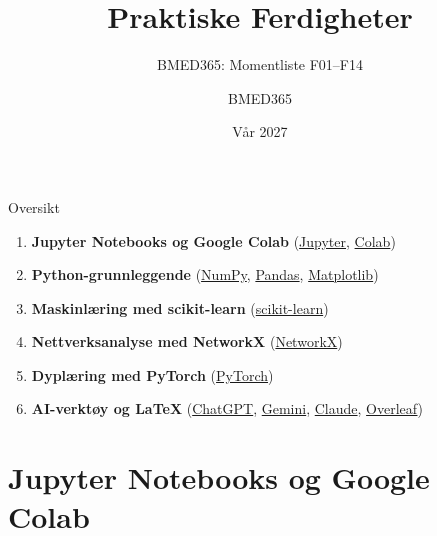 \documentclass[aspectratio=169, 10pt]{beamer}
\title{Praktiske Ferdigheter}
\subtitle{BMED365: Momentliste F01--F14}
\author{BMED365}
\date{Vår 2027}
\begin{document}
\begin{frame}
    \titlepage
\end{frame}

\begin{frame}{Oversikt}
    \begin{enumerate}
        \item \textbf{Jupyter Notebooks og Google Colab}
        (\href{https://jupyter.org/}{Jupyter}, \href{https://colab.research.google.com/}{Colab})
        \item \textbf{Python-grunnleggende}
        (\href{https://numpy.org/}{NumPy}, \href{https://pandas.pydata.org/}{Pandas}, \href{https://matplotlib.org/}{Matplotlib})
        \item \textbf{Maskinlæring med scikit-learn}
        (\href{https://scikit-learn.org/}{scikit-learn})
        \item \textbf{Nettverksanalyse med NetworkX}
        (\href{https://networkx.org/}{NetworkX})
        \item \textbf{Dyplæring med PyTorch}
        (\href{https://pytorch.org/}{PyTorch})
        \item \textbf{AI-verktøy og LaTeX}
        (\href{https://chat.openai.com/}{ChatGPT}, \href{https://gemini.google.com/}{Gemini}, \href{https://claude.ai/}{Claude}, \href{https://www.overleaf.com/}{Overleaf})
    \end{enumerate}
\end{frame}

\section{Jupyter Notebooks og Google Colab}
\end{document}
